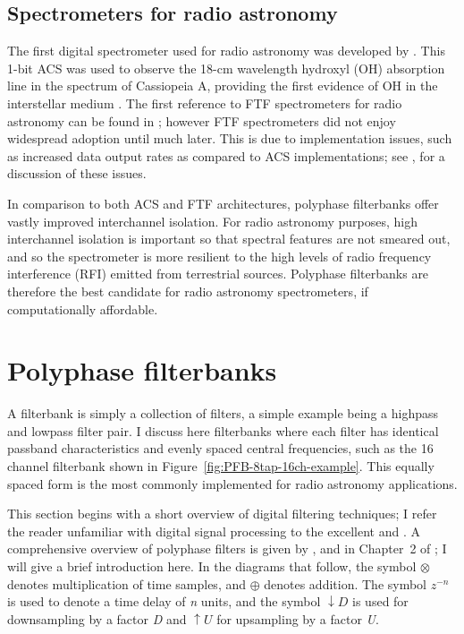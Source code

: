 \documentclass{ws-rv961x669}
\begin{document}
\subsection{Spectrometers for radio astronomy}

The first digital spectrometer used for radio astronomy was developed
by \citet{Weinreb:1963p10042}. This 1-bit ACS was used to observe
the 18-cm wavelength hydroxyl (OH) absorption line in the spectrum
of Cassiopeia A, providing the first evidence of OH in the interstellar
medium \citep{Weinreb:1963p9992}. The first reference to FTF spectrometers
for radio astronomy can be found in \citet{Chikada:1987p10044}; however
FTF spectrometers did not enjoy widespread adoption until much later.
This is due to implementation issues, such as increased data output
rates as compared to ACS implementations; see \citet{Bunton2000},
for a discussion of these issues.

In comparison to both ACS and FTF architectures, polyphase filterbanks
offer vastly improved interchannel isolation. For radio astronomy
purposes, high interchannel isolation is important so that spectral
features are not smeared out, and so the spectrometer is more resilient
to the high levels of radio frequency interference (RFI) emitted from
terrestrial sources. Polyphase filterbanks are therefore the best
candidate for radio astronomy spectrometers, if computationally affordable.


\section{Polyphase filterbanks}

A filterbank is simply a collection of filters, a simple example being
a highpass and lowpass filter pair. I discuss here filterbanks where
each filter has identical passband characteristics and evenly spaced
central frequencies, such as the 16 channel filterbank shown in Figure~\ref{fig:PFB-8tap-16ch-example}.
This equally spaced form is the most commonly implemented for radio
astronomy applications. 

This section begins with a short overview of digital filtering techniques;
I refer the reader unfamiliar with digital signal processing to the
excellent \citet{bookLyonsDSP} and \citet{BookSmithDSP}. A comprehensive
overview of polyphase filters is given by \citet{Vaidyanathan:1990p6127},
and in Chapter~2 of \citet{BookHarrisMultirateDSP}; I will give
a brief introduction here. In the diagrams that follow, the symbol
$\otimes$ denotes multiplication of time samples, and $\oplus$ denotes
addition. The symbol $z^{-n}$ is used to denote a time delay of \emph{n}
units, and the symbol $\downarrow D$ is used for downsampling by
a factor \emph{D} and $\uparrow U$ for upsampling by a factor \emph{U}.
\end{document}
